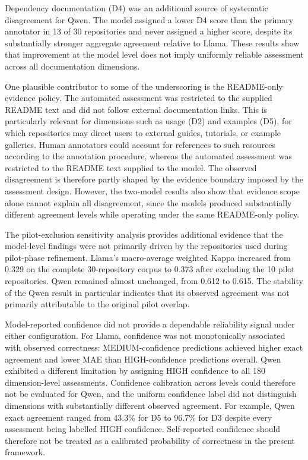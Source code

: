 Dependency documentation (D4) was an additional source of systematic
disagreement for Qwen. The model assigned a lower D4 score than the
primary annotator in 13 of 30 repositories and never assigned a
higher score, despite its substantially stronger aggregate agreement
relative to Llama. These results show that improvement at the
model level does not imply uniformly reliable assessment across all
documentation dimensions.

One plausible contributor to some of the underscoring is the
README-only evidence policy. The automated assessment was restricted
to the supplied README text and did not follow external documentation
links. This is particularly relevant for dimensions such as usage
(D2) and examples (D5), for which repositories may direct users to
external guides, tutorials, or example galleries. Human annotators
could account for references to such resources according to the
annotation procedure, whereas the automated assessment was restricted
to the README text supplied to the model. The observed disagreement
is therefore partly shaped by the evidence boundary imposed by the
assessment design. However, the two-model results also show that
evidence scope alone cannot explain all disagreement, since the
models produced substantially different agreement levels while
operating under the same README-only policy.

The pilot-exclusion sensitivity analysis provides additional evidence
that the model-level findings were not primarily driven by the
repositories used during pilot-phase refinement. Llama's
macro-average weighted Kappa increased from 0.329 on the complete
30-repository corpus to 0.373 after excluding the 10 pilot
repositories. Qwen remained almost unchanged, from 0.612 to 0.615.
The stability of the Qwen result in particular indicates that its
observed agreement was not primarily attributable to the original
pilot overlap.

Model-reported confidence did not provide a dependable reliability
signal under either configuration. For Llama, confidence was not
monotonically associated with observed correctness: MEDIUM-confidence
predictions achieved higher exact agreement and lower MAE than
HIGH-confidence predictions overall. Qwen exhibited a different
limitation by assigning HIGH confidence to all 180 dimension-level
assessments. Confidence calibration across levels could therefore not
be evaluated for Qwen, and the uniform confidence label did not
distinguish dimensions with substantially different observed
agreement. For example, Qwen exact agreement ranged from 43.3\% for
D5 to 96.7\% for D3 despite every assessment being labelled HIGH
confidence. Self-reported confidence should therefore not be treated
as a calibrated probability of correctness in the present framework.

